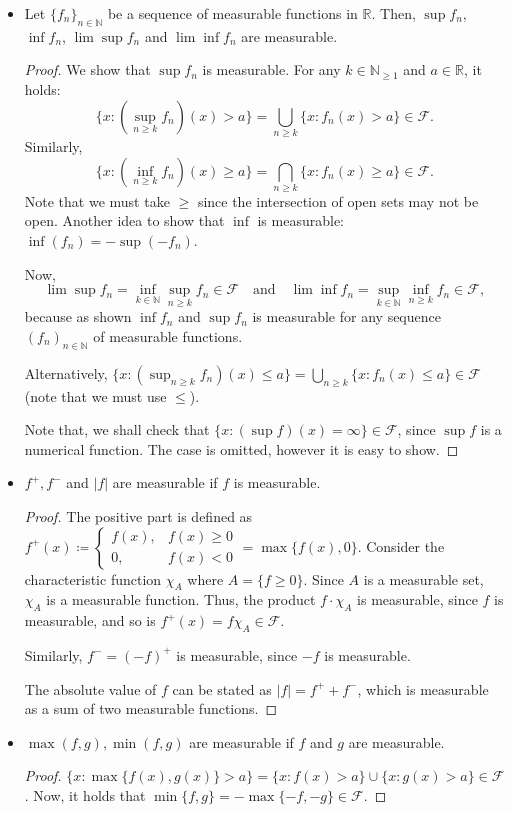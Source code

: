\documentclass[a4paper, 11pt]{article}
\theoremstyle{plain}
\theoremstyle{definition}
\begin{document}
\begin{itemize}
	\item Let $\{f_n\}_{n \in \mathbb N}$ be a sequence of measurable functions in $\mathbb R$. Then, $\sup f_n$, $\inf f_n$, $\lim \sup f_n$ and $\lim \inf f_n$ are measurable.
	\begin{proof}
		We show that $\sup f_n$ is measurable. For any $k \in \mathbb N_{\geq 1}$ and $a \in \mathbb R$, it holds:
		\[
			\{ x : (\sup_{n \geq k}f_n)(x) > a \} = \bigcup_{n \geq k} \{ x : f_n(x) > a \} \in \mathcal F.
		\]
		Similarly,
		\[
			\{ x: (\inf_{n \geq k}f_n)(x) \geq a \} = \bigcap_{n \geq k}\{ x: f_n(x) \geq a \} \in \mathcal F.
		\]
		Note that we must take $\geq$ since the intersection of open sets may not be open. Another idea to show that $\inf$ is measurable: $\inf(f_n) = -\sup(-f_n)$. 
		
		Now,
		\[
			\lim \sup f_n = \inf\limits_{k \in \mathbb N} \sup\limits_{n \geq k}f_n \in \mathcal F \quad \text{and} \quad \lim \inf f_n = \sup_{k \in \mathbb N} \inf_{n \geq k} f_n \in \mathcal F,
		\]
		because as shown $\inf f_n$ and $\sup f_n$  is measurable for any sequence $(f_n)_{n \in \mathbb N}$ of measurable functions.
		
		Alternatively, $\{ x : (\sup_{n \geq k}f_n)(x) \leq a \} = \bigcup_{n \geq k} \{ x : f_n(x) \leq a \} \in \mathcal F$ (note that we must use $\leq$).
		
		Note that, we shall check that $\{ x : (\sup f)(x) = \infty \} \in \mathcal F$, since $\sup f$ is a numerical function. The case is omitted, however it is easy to show. 
	\end{proof}

	\item $f^+,f^-$ and $|f|$ are measurable if $f$ is measurable.
	\begin{proof}
		The positive part is defined as $f^+(x) \coloneqq \begin{cases}
		f(x),  &f(x) \geq 0\\
		0, & f(x) < 0
		\end{cases} = \max\{f(x),0\}$.
		Consider the characteristic function $\chi_A$ where $A = \{ f \geq 0 \}$. Since $A$ is a measurable set, $\chi_A$ is a measurable function. Thus, the product $f \cdot \chi_A$ is measurable, since $f$ is measurable, and so is $f^+(x) = f\chi_A \in \mathcal F$.
		
		Similarly, $f^- = (-f)^+$ is measurable, since $-f$ is measurable.
		
		The absolute value of $f$ can be stated as $|f| = f^+ + f^-$, which is measurable as a sum of two measurable functions.
	\end{proof}

	\item $\max(f,g), \min(f,g)$ are measurable if $f$ and $g$ are measurable.
	\begin{proof}
		$\{ x : \max\{f(x),g(x)\} > a \} = \{ x : f(x) > a \} \cup \{ x : g(x) > a \} \in \mathcal F$. Now, it holds that $\min\{f,g\} = -\max\{-f,-g\} \in \mathcal F$.
	\end{proof}

\end{itemize}
\end{document}
